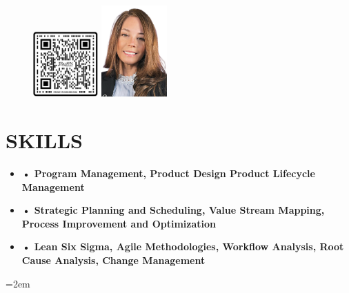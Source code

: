 \documentclass[AutoFakeBold]{resume}
\begin{document}
\begin{figure}[h]
    \begin{minipage}[c]{2.15cm}
        \centering
        \includegraphics[height=2.5cm,width=2.5cm]{QRCode.png}
    \end{minipage}
    \hfill
    \begin{minipage}[c]{2.5cm}
        \centering
        \includegraphics[height=3.5cm,width=2.5cm]{CV.png}
    \end{minipage}
\end{figure}
\vspace{-28mm}
\vspace{.5em}
\section{\makebox[.75em][c]{\faInfoCircle} \textbf{SKILLS}}
\vspace{1mm}
\begin{minipage}[b]{\textwidth}
    \centering
    \begin{itemize}
        \item[] \textbf{• Program Management, Product Design Product Lifecycle Management}
        \item[] \textbf{• Strategic Planning and Scheduling, Value Stream Mapping, Process Improvement and Optimization}
        \item[] \textbf{• Lean Six Sigma, Agile Methodologies, Workflow Analysis, Root Cause Analysis, Change Management}
    \end{itemize}
\end{minipage}
 \hangindent=2em 
\end{document}
